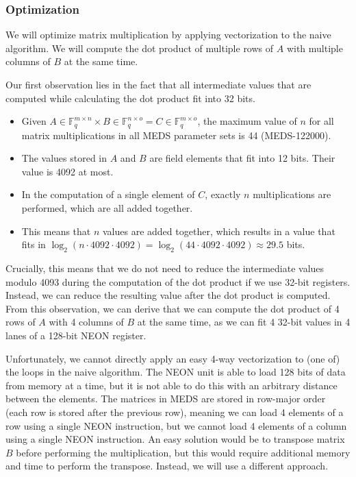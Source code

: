 \documentclass[11pt,a4paper]{report}
\theoremstyle{definition}
\begin{document}
\subsubsection{Optimization}
\label{sec:matrixmultiplicationoptimization}
We will optimize matrix multiplication by applying vectorization to the naive algorithm. We will compute the dot product of multiple rows of $A$ with multiple columns of $B$ at the same time.

Our first observation lies in the fact that all intermediate values that are computed while calculating the dot product fit into 32 bits.
\begin{itemize}
  \item Given $A \in \mathbb{F}_q^{m \times n} \times B \in \mathbb{F}_q^{n \times o} = C \in \mathbb{F}_q^{m \times o}$, the maximum value of $n$ for all matrix multiplications in all MEDS parameter sets is 44 (MEDS-122000).
  \item The values stored in $A$ and $B$ are field elements that fit into 12 bits. Their value is 4092 at most.
  \item In the computation of a single element of $C$, exactly $n$ multiplications are performed, which are all added together.
  \item This means that $n$ values are added together, which results in a value that fits in $\log_2(n \cdot 4092 \cdot 4092) = \log_2(44 \cdot 4092 \cdot 4092) \approx 29.5$ bits.
\end{itemize}
Crucially, this means that we do not need to reduce the intermediate values modulo 4093 during the computation of the dot product if we use 32-bit registers. Instead, we can reduce the resulting value after the dot product is computed. From this observation, we can derive that we can compute the dot product of 4 rows of $A$ with 4 columns of $B$ at the same time, as we can fit 4 32-bit values in 4 lanes of a 128-bit NEON register.

Unfortunately, we cannot directly apply an easy 4-way vectorization to (one of) the loops in the naive algorithm. The NEON unit is able to load 128 bits of data from memory at a time, but it is not able to do this with an arbitrary distance between the elements. The matrices in MEDS are stored in row-major order (each row is stored after the previous row), meaning we can load 4 elements of a row using a single NEON instruction, but we cannot load 4 elements of a column using a single NEON instruction. An easy solution would be to transpose matrix $B$ before performing the multiplication, but this would require additional memory and time to perform the transpose. Instead, we will use a different approach.
\end{document}

